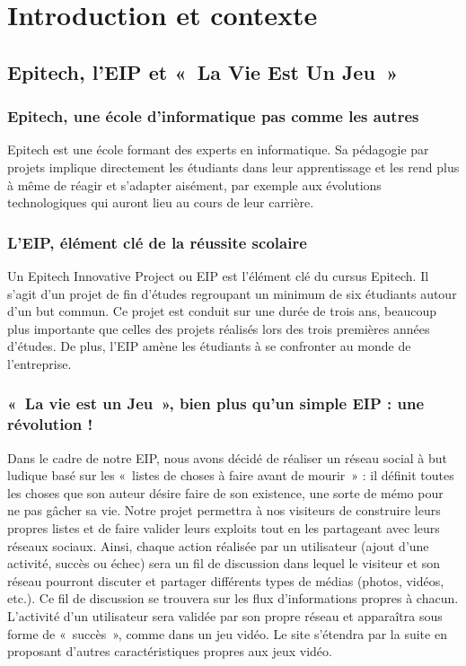 \documentclass{life-fr}
\begin{document}
\newpage

\tableofcontents


\chapter{Introduction et contexte}

\section{Epitech, l'EIP et «~La Vie Est Un Jeu~»}

\subsection{Epitech, une école d'informatique pas comme les autres}

Epitech est une école formant des experts en informatique. Sa pédagogie par projets
implique directement les étudiants dans leur apprentissage et les rend plus à même
de réagir et s'adapter aisément, par exemple aux évolutions technologiques qui
auront lieu au cours de leur carrière.

\subsection{L'EIP, élément clé de la réussite scolaire}

Un Epitech Innovative Project ou EIP est l'élément clé du cursus Epitech. Il s'agit d'un projet de fin d'études regroupant un minimum de six étudiants autour d'un but commun. Ce projet est conduit sur une durée de trois ans, beaucoup plus importante que celles des projets réalisés lors des trois premières années d'études. De plus, l'EIP amène les étudiants à se confronter au monde de l'entreprise.

\subsection{«~La vie est un Jeu~», bien plus qu'un simple EIP : une révolution !}

Dans le cadre de notre EIP, nous avons décidé de réaliser un réseau social à but ludique basé sur les «~listes de choses à faire avant de mourir~» : il définit toutes les choses que son auteur désire faire de son existence, une sorte de mémo pour ne pas gâcher sa vie. Notre projet permettra à nos visiteurs de construire leurs propres listes et de faire valider leurs exploits tout en les partageant avec leurs réseaux sociaux. Ainsi, chaque action réalisée par un utilisateur (ajout d'une activité, succès ou échec) sera un fil de discussion dans lequel le visiteur et son réseau pourront discuter et partager différents types de médias (photos, vidéos, etc.). Ce fil de discussion se trouvera sur les flux d'informations propres à chacun. L'activité d'un utilisateur sera validée par son propre réseau et apparaîtra sous forme de «~succès~», comme dans un jeu vidéo. Le site s'étendra par la suite en proposant d'autres caractéristiques propres aux jeux vidéo.
\end{document}
